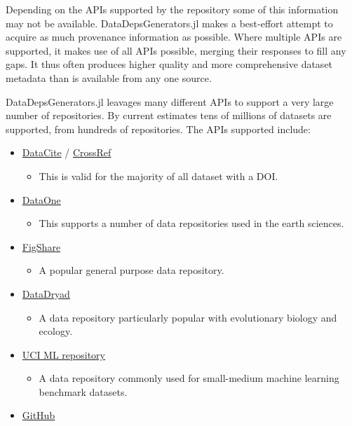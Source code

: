\documentclass{book}
\begin{document}
Depending on the APIs supported by the repository some of this
information may not be available. DataDepsGenerators.jl makes a
best-effort attempt to acquire as much provenance information as
possible. Where multiple APIs are supported, it makes use of all APIs
possible, merging their responses to fill any gaps. It thus often
produces higher quality and more comprehensive dataset metadata than is
available from any one source.

DataDepsGenerators.jl leavages many different APIs to support a very
large number of repositories. By current estimates tens of millions of
datasets are supported, from hundreds of repositories. The APIs
supported include:

\begin{itemize}[noitemsep,topsep=0pt]
	\item
	\href{https://datacite.org/}{DataCite} /
	\href{https://www.crossref.org/}{CrossRef}
	
	\begin{itemize}
		\item
		This is valid for the majority of all dataset with a DOI.
	\end{itemize}
	\item
	\href{https://www.dataone.org/}{DataOne}
	
	\begin{itemize}
		\item
		This supports a number of data repositories used in the earth
		sciences.
	\end{itemize}
	\item
	\href{http://figshare.com/}{FigShare}
	\begin{itemize}
		\item
		A popular general purpose data repository.
	\end{itemize}
	\item
	\href{http://datadryad.org/}{DataDryad}
	
	\begin{itemize}
		
		\item
		A data repository particularly popular with evolutionary biology and
		ecology.
	\end{itemize}
	\item
	\href{https://archive.ics.uci.edu/ml/}{UCI ML repository}
	
	\begin{itemize}
		
		\item
		A data repository commonly used for small-medium machine learning
		benchmark datasets.
	\end{itemize}
	\item
	\href{https://github.com}{GitHub}
	

\end{itemize}
\end{document}
